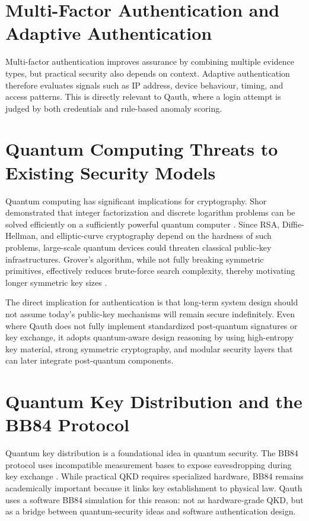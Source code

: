 \documentclass[12pt,a4paper]{report}
\begin{document}
\section{Multi-Factor Authentication and Adaptive Authentication}
Multi-factor authentication improves assurance by combining multiple evidence types, but practical security also depends on context. Adaptive authentication therefore evaluates signals such as IP address, device behaviour, timing, and access patterns. This is directly relevant to Qauth, where a login attempt is judged by both credentials and rule-based anomaly scoring.

\section{Quantum Computing Threats to Existing Security Models}
Quantum computing has significant implications for cryptography. Shor demonstrated that integer factorization and discrete logarithm problems can be solved efficiently on a sufficiently powerful quantum computer \cite{shor1994}. Since RSA, Diffie-Hellman, and elliptic-curve cryptography depend on the hardness of such problems, large-scale quantum devices could threaten classical public-key infrastructures. Grover's algorithm, while not fully breaking symmetric primitives, effectively reduces brute-force search complexity, thereby motivating longer symmetric key sizes \cite{grover1996}.

The direct implication for authentication is that long-term system design should not assume today's public-key mechanisms will remain secure indefinitely. Even where Qauth does not fully implement standardized post-quantum signatures or key exchange, it adopts quantum-aware design reasoning by using high-entropy key material, strong symmetric cryptography, and modular security layers that can later integrate post-quantum components.

\section{Quantum Key Distribution and the BB84 Protocol}
Quantum key distribution is a foundational idea in quantum security. The BB84 protocol uses incompatible measurement bases to expose eavesdropping during key exchange \cite{bb84}. While practical QKD requires specialized hardware, BB84 remains academically important because it links key establishment to physical law. Qauth uses a software BB84 simulation for this reason: not as hardware-grade QKD, but as a bridge between quantum-security ideas and software authentication design.
\end{document}
